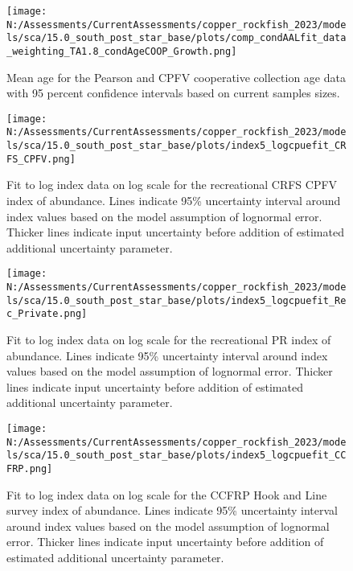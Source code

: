 \documentclass[11pt,
  english,
  letterpaper,
]{article}
\begin{document}
\pagebreak

\begin{figure}
\centering
\texttt{[image: N:/Assessments/CurrentAssessments/copper\_rockfish\_2023/models/sca/15.0\_south\_post\_star\_base/plots/comp\_condAALfit\_data\_weighting\_TA1.8\_condAgeCOOP\_Growth.png]}
\caption{Mean age for the Pearson and CPFV cooperative collection age data with 95 percent confidence intervals based on current samples sizes.\label{fig:coop-mean-age-fit}}
\end{figure}

\pagebreak

\begin{figure}
\centering
\texttt{[image: N:/Assessments/CurrentAssessments/copper\_rockfish\_2023/models/sca/15.0\_south\_post\_star\_base/plots/index5\_logcpuefit\_CRFS\_CPFV.png]}
\caption{Fit to log index data on log scale for the recreational CRFS CPFV index of abundance. Lines indicate 95\% uncertainty interval around index values based on the model assumption of lognormal error. Thicker lines indicate input uncertainty before addition of estimated additional uncertainty parameter.\label{fig:crfs-cpfv-index-fit}}
\end{figure}

\pagebreak

\begin{figure}
\centering
\texttt{[image: N:/Assessments/CurrentAssessments/copper\_rockfish\_2023/models/sca/15.0\_south\_post\_star\_base/plots/index5\_logcpuefit\_Rec\_Private.png]}
\caption{Fit to log index data on log scale for the recreational PR index of abundance. Lines indicate 95\% uncertainty interval around index values based on the model assumption of lognormal error. Thicker lines indicate input uncertainty before addition of estimated additional uncertainty parameter.\label{fig:crfs-pr-index-fit}}
\end{figure}

\pagebreak

\begin{figure}
\centering
\texttt{[image: N:/Assessments/CurrentAssessments/copper\_rockfish\_2023/models/sca/15.0\_south\_post\_star\_base/plots/index5\_logcpuefit\_CCFRP.png]}
\caption{Fit to log index data on log scale for the CCFRP Hook and Line survey index of abundance. Lines indicate 95\% uncertainty interval around index values based on the model assumption of lognormal error. Thicker lines indicate input uncertainty before addition of estimated additional uncertainty parameter.\label{fig:ccfrp-index-fit}}
\end{figure}
\end{document}
